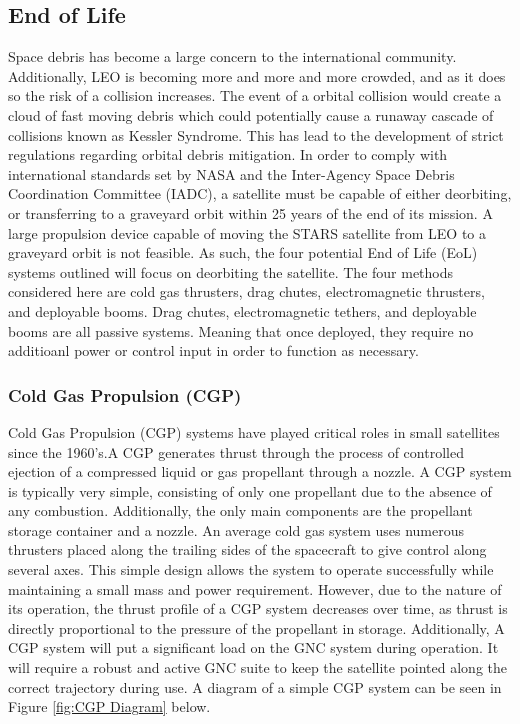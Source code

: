 \subsection{End of Life}

Space debris has become a large concern to the international community. Additionally, LEO is becoming more and more and more crowded, and as it does so the risk of a collision increases. The event of a orbital collision would create a cloud of fast moving debris which could potentially cause a runaway cascade of collisions known as Kessler Syndrome.\cite{Kessler_Syndrome}  This has lead to the development of strict regulations regarding orbital debris mitigation. In order to comply with international standards set by NASA and the Inter-Agency Space Debris Coordination Committee (IADC), a satellite must be capable of either deorbiting, or transferring to a graveyard orbit within 25 years of the end of its mission.\cite{STD8719} A large propulsion device capable of moving the STARS satellite from LEO to a graveyard orbit is not feasible. As such, the four potential End of Life (EoL) systems outlined will focus on deorbiting the satellite. The four methods considered here are cold gas thrusters, drag chutes, electromagnetic thrusters, and deployable booms. Drag chutes, electromagnetic tethers, and deployable booms are all passive systems. Meaning that once deployed, they require no additioanl power or control input in order to function as necessary. 
\subsubsection{Cold Gas Propulsion (CGP)}

Cold Gas Propulsion (CGP) systems have played critical roles in small satellites since the 1960's.A CGP generates thrust through the process of controlled ejection of a compressed liquid or gas propellant through a nozzle. A CGP system is typically very simple, consisting of only one propellant due to the absence of any combustion. Additionally, the only main components are the propellant storage container and a nozzle. An average cold gas system uses numerous thrusters placed along the trailing sides of the spacecraft to give control along several axes. This simple design allows the system to operate successfully while maintaining a small mass and power requirement. However, due to the nature of its operation, the thrust profile of a CGP system decreases over time, as thrust is directly proportional to the pressure of the propellant in storage.\cite{Passive_Deorbit} Additionally, A CGP system will put a significant load on the GNC system during operation. It will require a robust and active GNC suite to keep the satellite pointed along the correct trajectory during use. A diagram of a simple CGP system can be seen in Figure \ref{fig:CGP Diagram} below.

